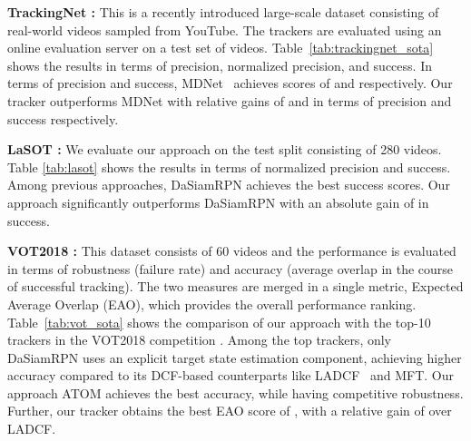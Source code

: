 \documentclass[10pt,twocolumn,letterpaper]{article}
\newcommand{\parsection}[1]{\noindent\textbf{#1:} }
\begin{document}
\parsection{TrackingNet \cite{TrackingNet}} This is a recently introduced large-scale dataset consisting of real-world videos sampled from YouTube. The trackers are evaluated using an online evaluation server on a test set of  videos. Table~\ref{tab:trackingnet_sota} shows the results in terms of precision, normalized precision, and success. In terms of precision and success, MDNet~\cite{MDNet} achieves scores of  and  respectively. Our tracker outperforms MDNet with relative gains of  and  in terms of precision and success respectively.

\begin{table}[!t]
	\centering\vspace{-1mm}
	\vspace{1mm}\caption{State-of-the-art comparison on the LaSOT dataset in terms of normalized precision and success.}
	\label{tab:lasot}\vspace{-1mm}
\end{table}

\parsection{LaSOT \cite{LaSOT}} We evaluate our approach on the test split consisting of 280 videos. Table \ref{tab:lasot} shows the results in terms of normalized precision and success. Among previous approaches, DaSiamRPN achieves the best success scores. Our approach significantly outperforms DaSiamRPN with an absolute gain of  in success.

\parsection{VOT2018 \cite{VOT2018}} This dataset consists of 60 videos and the performance is evaluated in terms of robustness (failure rate) and accuracy (average overlap in the course of successful tracking). The two measures are merged in a single metric, Expected Average Overlap (EAO), which provides the overall performance ranking. Table~\ref{tab:vot_sota} shows the comparison of our approach with the top-10 trackers in the VOT2018 competition \cite{VOT2018}. Among the top trackers, only DaSiamRPN uses an explicit target state estimation component, achieving higher accuracy compared to its DCF-based counterparts like LADCF~\cite{LADCF} and MFT. Our approach ATOM achieves the best accuracy, while having competitive robustness. Further, our tracker obtains the best EAO score of , with a relative gain of  over LADCF.
\end{document}
